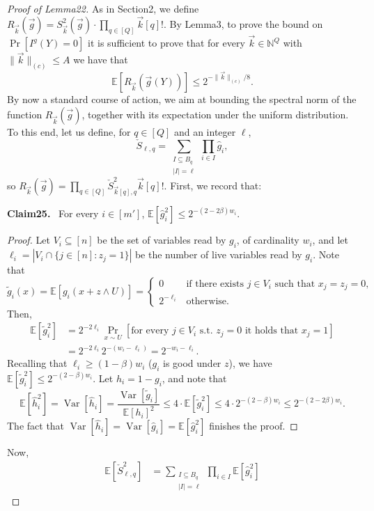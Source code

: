\documentclass[10pt,a4paper]{article}
\newenvironment{authorclaim}[1]{\par\medskip\noindent\textbf{#1.}\ \ignorespaces}{\par\medskip}
\begin{document}
\begin{proof}[Proof of Lemma22]
As in Section2, we define $R_{\vec k}(\vec g)=S_{\vec k}^2(\vec g)\cdot\prod_{q\in[Q]}\vec k[q]!$.
By Lemma3, to prove the bound on $\Pr[I^g(Y)=0]$ it is sufficient to prove that for every $\vec k\in\mathbb N^Q$ with $\|\vec k\|_{(c)}\le A$ we have that
\[
\mathbb E[R_{\vec k}(\vec g(Y))]\le2^{-\|\vec k\|_{(c)}/8}.
\]
By now a standard course of action, we aim at bounding the spectral norm of the function $R_{\vec k}(\vec g)$, together with its expectation under the uniform distribution. To this end, let us define, for $q\in[Q]$ and an integer $\ell$,
\[
\check S_{\ell,q}=\sum_{\substack{I\subseteq B_q\\|I|=\ell}}\prod_{i\in I}\widehat g_i,
\]
so $R_{\vec k}(\vec g)=\prod_{q\in[Q]}\check S_{\vec k[q],q}^2\vec k[q]!$. First, we record that:
\begin{authorclaim}{Claim25}
For every $i\in[m']$, $\mathbb E[\widehat g_i^2]\le2^{-(2-2\beta)w_i}$.
\end{authorclaim}
\begin{proof}
Let $V_i\subseteq[n]$ be the set of variables read by $g_i$, of cardinality $w_i$, and let $\ell_i=|V_i\cap\{j\in[n]:z_j=1\}|$ be the number of live variables read by $g_i$. Note that
\[
\widetilde g_i(x)=\mathbb E[g_i(x+z\wedge U)]
=\begin{cases}0&\text{if there exists }j\in V_i\text{ such that }x_j=z_j=0,\\2^{-\ell_i}&\text{otherwise}.\end{cases}
\]
Then,
\begin{align*}
\mathbb E[\widetilde g_i^2]
&=2^{-2\ell_i}\Pr_{x\sim U}[\text{for every }j\in V_i\text{ s.t. }z_j=0\text{ it holds that }x_j=1]\\
&=2^{-2\ell_i}2^{-(w_i-\ell_i)}=2^{-w_i-\ell_i}.
\end{align*}
Recalling that $\ell_i\ge(1-\beta)w_i$ ($g_i$ is good under $z$), we have $\mathbb E[\widetilde g_i^2]\le2^{-(2-\beta)w_i}$. Let $h_i=1-g_i$, and note that
\[
\mathbb E[\widehat h_i^2]=\operatorname{Var}[\widehat h_i]
=\frac{\operatorname{Var}[\widetilde g_i]}{\mathbb E[h_i]^2}
\le4\cdot\mathbb E[\widetilde g_i^2]\le4\cdot2^{-(2-\beta)w_i}
\le2^{-(2-2\beta)w_i}.
\]
The fact that $\operatorname{Var}[\widehat h_i]=\operatorname{Var}[\widehat g_i]=\mathbb E[\widehat g_i^2]$ finishes the proof.
\end{proof}
Now,
\begin{align*}
\mathbb E[\check S_{\ell,q}^2]
&=\sum_{\substack{I\subseteq B_q\\|I|=\ell}}\prod_{i\in I}\mathbb E[\widehat g_i^2]

\end{align*}
\end{proof}
\end{document}
